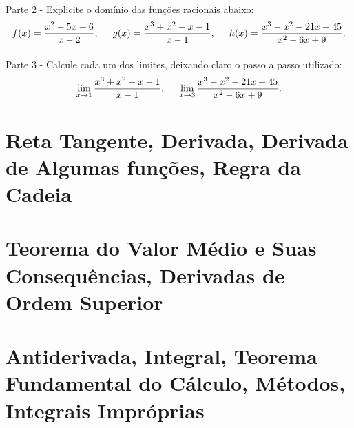 \documentclass{article}
\begin{document}
\paragraph{} Parte 2 - Explicite o dom\'inio das fun\c c\~oes racionais abaixo:
$$
	f(x) = \frac{x^2 - 5x + 6}{x - 2}, \hspace{0.5cm} g(x) = \frac{x^3 + x^2 - x - 1}{x - 1}, \hspace{0.5cm} h(x) = \frac{x^3 - x^2 - 21x + 45}{x^2 - 6x + 9}.
$$

\paragraph{} Parte 3 - Calcule cada um dos limites, deixando claro o passo a passo utilizado: 
$$
\lim_{x\to1} \frac{x^3 + x^2 - x - 1}{x - 1}, \hspace{0.5cm} \lim_{x\to3}\frac{x^3 - x^2 - 21x + 45}{x^2 - 6x + 9}.
$$
\newpage

\newpage
\section{Reta Tangente, Derivada, Derivada de Algumas fun\c c\~oes, Regra da Cadeia}

\newpage
\section{Teorema do Valor M\'edio e Suas Consequ\^encias, Derivadas de Ordem Superior}

\newpage
\section{Antiderivada, Integral, Teorema Fundamental do C\'alculo, M\'etodos, Integrais Impr\'oprias}
\end{document}
